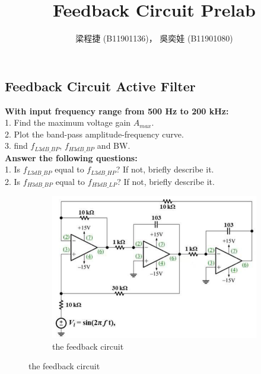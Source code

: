 \documentclass{article}
\title{Feedback Circuit Prelab}
\author{梁程捷 (B11901136)， 吳奕娃 (B11901080)}
\date{}
\begin{document}
\begin{CJK*}{UTF8}{bkai}

\maketitle

\section*{Feedback Circuit Active Filter}
\textbf{With input frequency range from 500 \unit{\hertz} to 200 \unit{\kilo\hertz}:}    \\
1. Find the maximum voltage gain $A_{max}$.   \\
2. Plot the band-pass amplitude-frequency curve.    \\
3. find $f_{L3dB\_BP}$, $f_{H3dB\_BP}$ and BW.    \vspace{3mm} \\ 
\textbf{Answer the following questions:}     \\
1. Is $f_{L3dB\_BP}$ equal to $f_{L3dB\_HP}$? If not, briefly describe it.    \\
2. Is $f_{H3dB\_BP}$ equal to $f_{H3dB\_LP}$? If not, briefly describe it.    \\


\begin{figure}[h]
    \begin{center}
    
        \begin{subfigure}[b]{0.8\textwidth}
            \includegraphics[width=\textwidth]{feedback_circuit.png}
            \caption*{the feedback circuit}
        \end{subfigure}
    \end{center}
\end{figure}

    
\end{CJK*}
\end{document}
